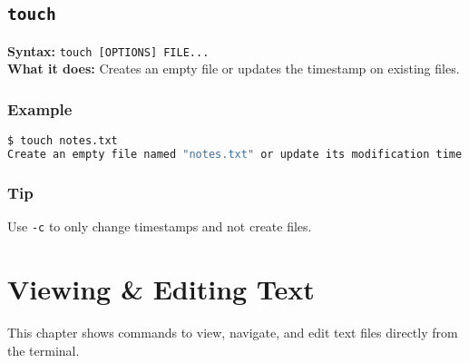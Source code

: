 \documentclass[10pt,oneside]{scrbook}
\begin{document}
\section{\texttt{touch}}
\begin{cmdbox}
  \textbf{Syntax:} \lstinline!touch [OPTIONS] FILE...! \\
  \textbf{What it does:} Creates an empty file or updates the timestamp on existing files.
\end{cmdbox}
\begin{commanddetails}
  \subsection*{Example}
  \begin{lstlisting}[language=bash]
$ touch notes.txt
Create an empty file named "notes.txt" or update its modification time.
  \end{lstlisting}

  \subsection*{Tip}
  Use \lstinline!-c! to only change timestamps and not create files.
\end{commanddetails}
\chapter{Viewing \& Editing Text}

This chapter shows commands to view, navigate, and edit text files directly from the terminal.

\end{document}
